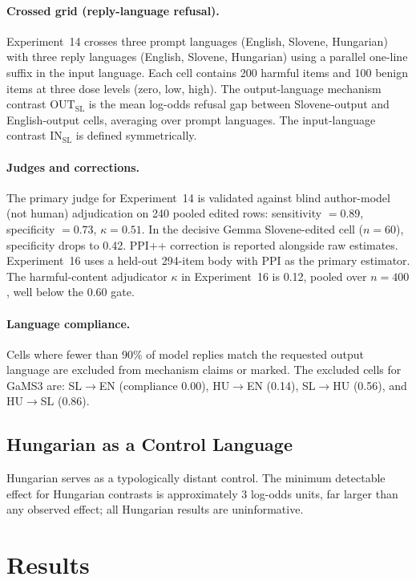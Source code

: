 \documentclass[11pt,letterpaper]{article}
\begin{document}
\paragraph{Crossed grid (reply-language refusal).}
Experiment~14 crosses three prompt languages (English, Slovene, Hungarian) with three reply languages (English, Slovene, Hungarian) using a parallel one-line suffix in the input language.
Each cell contains 200 harmful items and 100 benign items at three dose levels (zero, low, high).
The output-language mechanism contrast $\mathrm{OUT}_{\mathrm{SL}}$ is the mean log-odds refusal gap between Slovene-output and English-output cells, averaging over prompt languages.
The input-language contrast $\mathrm{IN}_{\mathrm{SL}}$ is defined symmetrically.

\paragraph{Judges and corrections.}
The primary judge for Experiment~14 is validated against blind author-model (not human) adjudication on 240 pooled edited rows: sensitivity $= 0.89$, specificity $= 0.73$, $\kappa = 0.51$.
In the decisive Gemma Slovene-edited cell ($n = 60$), specificity drops to 0.42.
PPI++ correction \citep{Angelopoulos2023} is reported alongside raw estimates.
Experiment~16 uses a held-out 294-item body with PPI as the primary estimator.
The harmful-content adjudicator $\kappa$ in Experiment~16 is 0.12, pooled over $n = 400$, well below the 0.60 gate.

\paragraph{Language compliance.}
Cells where fewer than 90\% of model replies match the requested output language are excluded from mechanism claims or marked.
The excluded cells for GaMS3 are: SL$\to$EN (compliance 0.00), HU$\to$EN (0.14), SL$\to$HU (0.56), and HU$\to$SL (0.86).

\subsection{Hungarian as a Control Language}

Hungarian serves as a typologically distant control.
The minimum detectable effect for Hungarian contrasts is approximately 3 log-odds units, far larger than any observed effect; all Hungarian results are uninformative.

\section{Results}
\end{document}
